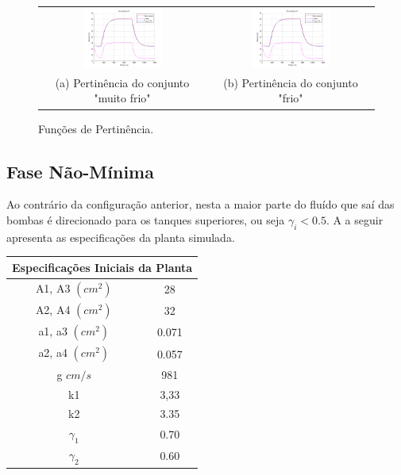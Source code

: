 \begin{figure}[H]
	\centering
	\begin{tabular}{cc}
		\includegraphics[width=0.5\textwidth,keepaspectratio]{img/FM_h1_5_10_15.png} &
		\includegraphics[width=0.5\textwidth,keepaspectratio]{img/FM_h1_5_10_15.png} \\
		(a) Pertinência do conjunto "muito frio" &
		(b) Pertinência do conjunto "frio"
	\end{tabular}
	\caption{\label{imgTS15} Funções de Pertinência.}
\end{figure}

\subsection{Fase Não-Mínima}
Ao contrário da configuração anterior, nesta a maior parte do fluído que saí das bombas é direcionado  para os tanques superiores, ou seja $\gamma_i < 0.5$. A  a seguir apresenta as especificações da planta simulada.

\begin{center} \label{tabFaseNM}
	\begin{tabular}{|c|c|}
		\hline
		\multicolumn{2}{|c|}{Especificações Iniciais da Planta} \\
		\hline
		A1, A3 $(cm^2)$ & 28 \\ \hline
		A2, A4 $(cm^2)$ & 32 \\ \hline
		a1, a3 $(cm^2)$ & 0.071 \\ \hline
		a2, a4 $(cm^2)$ & 0.057 \\ \hline
		g $cm/s$ & 981 \\ \hline
		k1 & 3,33 \\ \hline
		k2 & 3.35 \\ \hline
		$\gamma_1$ & 0.70 \\ \hline
		$\gamma_2$ & 0.60 \\ \hline
		\hline
	\end{tabular}
\end{center}

